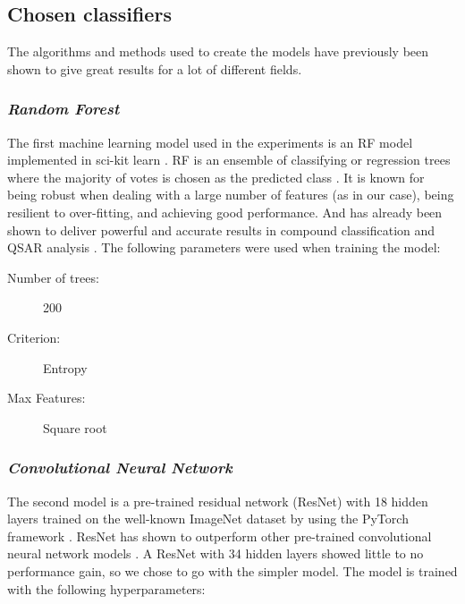 \documentclass[\ifafour a4paper,12pt,\else a5paper,10pt,\fi%
onecolumn,oneside,article,%
british%
]{memoir}
\theoremstyle{remark}
\theoremstyle{innote}
\renewcommand*{\|}[1][]{\nonscript\:#1\vert\nonscript\:\mathopen{}}
\begin{document}
\subsection{Chosen classifiers} 

The algorithms and methods used to create the models have previously been shown to give great results for a lot of different fields.

\subsubsection{\textit{Random Forest}}

The first machine learning model used in the experiments is an RF model implemented in sci-kit learn \autocites{pedregosaetal2011}. RF is an ensemble of classifying or regression trees where the majority of votes is chosen as the predicted class \autocites{breiman2001b}. It is known for being robust when dealing with a large number of features (as in our case), being resilient to over-fitting, and achieving good performance. And has already been shown to deliver powerful and accurate results in compound classification and QSAR analysis \autocites{svetniketal2003}. The following parameters were used when training the model: 

\medskip

\begin{framed}
  \begin{description}
  \item[Number of trees:] 200 
  \item[Criterion:] Entropy 
  \item[Max Features:] Square root
  \end{description}
\end{framed}

\subsubsection{\textit{Convolutional Neural Network}} 
The second model is a pre-trained residual network (ResNet) \autocites{heetal2016} with 18 hidden layers trained on the well-known ImageNet dataset  \autocites{russakovskyetal2015} by using the PyTorch framework \autocites{paszkeetal2019}. ResNet has shown to outperform other pre-trained convolutional neural network models \autocites{heetal2016}. A ResNet with 34 hidden layers showed little to no performance gain, so we chose to go with the simpler model. The model is trained with the following hyperparameters:
\medskip
\end{document}
